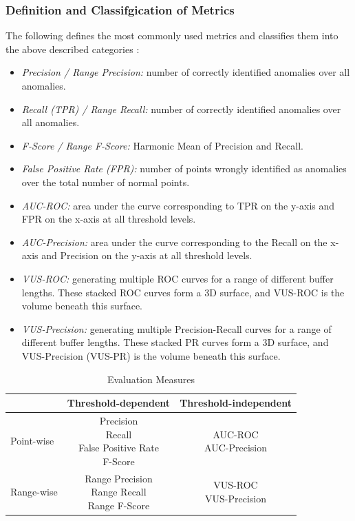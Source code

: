 \documentclass[12pt,oneside]{article}
\begin{document}
\subsubsection{Definition and Classifgication of Metrics}

The following defines the most commonly used metrics and classifies them into the above described categories \parencites[p.2776-2780]{papaVus}:
\begin{itemize}
    \item \textit{Precision / Range Precision:} number of correctly identified anomalies over all anomalies.
    \item \textit{Recall (TPR) / Range Recall:} number of correctly identified anomalies over all anomalies.
    \item \textit{F-Score / Range F-Score:} Harmonic Mean of Precision and Recall. 
    \item \textit{False Positive Rate (FPR):} number of points wrongly identified as anomalies over the total number of normal points.
    \item \textit{AUC-ROC:} area under the curve corresponding to TPR on the y-axis and FPR on the x-axis at all threshold levels.
    \item \textit{AUC-Precision:} area under the curve corresponding to the Recall on the x-axis and Precision on the y-axis at all threshold levels.
    \item \textit{VUS-ROC:} generating multiple ROC curves for a range of different buffer lengths. These stacked ROC curves form a 3D surface, and VUS-ROC is the volume beneath this surface.
    \item \textit{VUS-Precision:} generating multiple Precision-Recall curves for a range of different buffer lengths. These stacked PR curves form a 3D surface, and VUS-Precision (VUS-PR) is the volume beneath this surface.
\end{itemize}




\begin{table}[htbp]
  \centering
  \label{tab:evaluation_categories}

  \begin{tabular}{lcc}
    \toprule
    & Threshold-dependent & Threshold-independent \\
    \midrule
    Point-wise & \makecell[l]{Precision \\ Recall \\ False Positive Rate \\ F-Score} & \makecell[l]{AUC-ROC \\ AUC-Precision} \\
    \midrule
    Range-wise & \makecell[l]{Range Precision \\ Range Recall \\ Range F-Score} & \makecell[l]{VUS-ROC \\ VUS-Precision} \\
    \bottomrule
  \end{tabular}
  \caption{Evaluation Measures}

\end{table}
\end{document}
